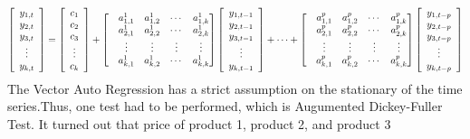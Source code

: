 \documentclass{article}
\begin{document}
\begin{equation}
\left[
	\begin{array}[]{c}
		y_{1,t} \\
		y_{2,t} \\
		y_{3,t} \\
		\vdots \\
		y_{k,t} 
	\end{array}
\right]
=
\left[
	\begin{array}[]{c}
		c_{1} \\
		c_{2} \\
		c_{3} \\
		\vdots \\
		c_{k}
	\end{array}
\right]
+
\left[
	\begin{matrix}
		&a_{1,1}^{1}    &a_{1,2}^{1}    &\cdots    &a_{1,k}^{1} \\
		&a_{2,1}^{1}    &a_{2,2}^{1}    &\cdots    &a_{2,k}^{1} \\
		&\vdots         &\vdots         &\vdots    &\vdots\\
		&a_{k,1}^{1}    &a_{k,2}^{1}    &\cdots    &a_{k,k}^{1} \\   
	\end{matrix}
\right]
\left[
	\begin{array}[]{c}
		y_{1, t-1} \\
		y_{2, t-1} \\
		y_{3, t-1} \\
		\vdots \\
		y_{k, t-1}
	\end{array}
\right]
+ \cdots +
\left[
	\begin{matrix}
		&a_{1,1}^{p}    &a_{1,2}^{p}    &\cdots    &a_{1,k}^{p} \\
		&a_{2,1}^{p}    &a_{2,2}^{p}    &\cdots    &a_{2,k}^{p} \\
		&\vdots         &\vdots         &\vdots    &\vdots\\
		&a_{k,1}^{p}    &a_{k,2}^{p}    &\cdots    &a_{k,k}^{p} \\   
	\end{matrix}
\right]
\left[
	\begin{array}[]{c}
		y_{1, t-p} \\
		y_{2, t-p} \\
		y_{3, t-p} \\
		\vdots \\
		y_{k, t-p}
	\end{array}
\right]
\end{equation}
The Vector Auto Regression has a strict assumption on the stationary of the time series.Thus, one test had to be performed, which is Augumented Dickey-Fuller Test. It turned out that price of product 1, product 2, and product 3
\end{document}
